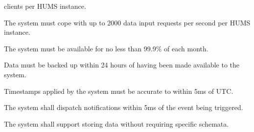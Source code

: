 \begin{description}
	clients per HUMS instance. 
	\item[\nfr{9}]  The system must cope with up to 2000 data input 
	requests per second per HUMS instance. 
	\item[\nfr{10}] The system must be available for no less than 99.9\% of 
	each month.
	\item[\nfr{11}]  Data must be backed up within 24 hours of having been 
	made available to the system.
	 \item[\nfr{12}] Timestamps applied by the system must be accurate to 
	within 5ms of UTC.
	\item[\nfr{13}]  The system shall dispatch notifications within 5ms of the 
	event being triggered.
	\item[\nfr{14}] The system shall support storing data without requiring 
	specific schemata.
\end{description}

